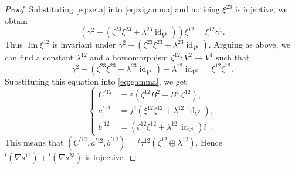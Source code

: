 \documentclass[12pt]{amsart}
\def\frak{\mathfrak}
\theoremstyle{definition}
\theoremstyle{remark}
\numberwithin{equation}{subsection}
\newcommand{\lemref}[1]{Lemma~\ref{#1}}
\newcommand{\lsp}[2]{\,{}^{#1}{#2}}
\newcommand{\Ima}{\operatorname{Im}}
\newcommand{\id}{\operatorname{id}}
\newcommand{\bv}{{\mathbf v}} %
\newcommand{\bw}{{\mathbf w}} %
\newcommand{\Pa}{{\frak P}} %
\begin{document}
\begin{proof}
Substituting \eqref{eq:zeta} into \eqref{eq:xigamma} and noticing
$\xi^{23}$ is injective, we obtain
\begin{equation}
\label{eq:xigamma'}
  \left(
    \gamma^2 - (\zeta^{23}\xi^{23} + \lambda^{23}\id_{V^2})
  \right)\xi^{12} 
  = \xi^{12}\gamma^1 .
\end{equation}
Thus $\Ima\xi^{12}$ is invariant under
\(
    \gamma^2 - (\zeta^{23}\xi^{23} + \lambda^{23}\id_{V^2}).
\)
Arguing as above, we can find a constant $\lambda^{12}$ and
a homomorphism $\zeta^{12}\colon V^2\to V^1$ such that
\begin{equation}
\label{eq:zeta'}
  \gamma^2 - (\zeta^{23}\xi^{23} + \lambda^{23}\id_{V^2})
  - \lambda^{12}\id_{V^2} = \xi^{12}\zeta^{12}.
\end{equation}
Substituting this equation into \eqref{eq:gamma}, we get
\begin{equation*}
\left\{\begin{split}
        C^{\prime 12} &= 
        \varepsilon (\zeta^{12}B^2 - B^1 \,\zeta^{12}), \\
        a^{\prime 12} &= j^2  (\xi^{12}\zeta^{12} +
                \lambda^{12}\,\id_{V^2}),\\
        b^{\prime 12} &= (\zeta^{12}\xi^{12} 
                  + \lambda^{12}\,\id_{V^1}) i^1.
\end{split}\right.
\end{equation*}
This means that
\(
(C^{\prime 12}, a^{\prime 12}, b^{\prime 12})
= \lsp{t}{\tau^{12}}(\zeta^{12}\oplus\lambda^{12})
\).
Hence ${}^t (\nabla s^{12}) + {}^t (\nabla s^{23})$ is injective.
\end{proof}

\end{document}

